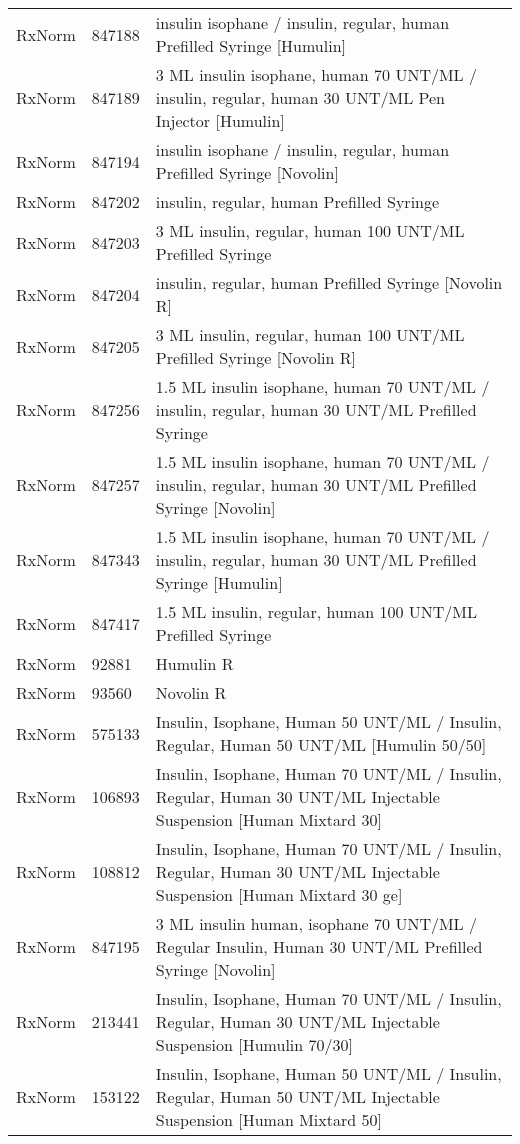 \begin{longtable}{p{}p{}p{}}
  RxNorm & 847188 & insulin isophane / insulin, regular, human Prefilled Syringe [Humulin] \\ 
  RxNorm & 847189 & 3 ML insulin isophane, human 70 UNT/ML / insulin, regular, human 30 UNT/ML Pen Injector [Humulin] \\ 
  RxNorm & 847194 & insulin isophane / insulin, regular, human Prefilled Syringe [Novolin] \\ 
  RxNorm & 847202 & insulin, regular, human Prefilled Syringe \\ 
  RxNorm & 847203 & 3 ML insulin, regular, human 100 UNT/ML Prefilled Syringe \\ 
  RxNorm & 847204 & insulin, regular, human Prefilled Syringe [Novolin R] \\ 
  RxNorm & 847205 & 3 ML insulin, regular, human 100 UNT/ML Prefilled Syringe [Novolin R] \\ 
  RxNorm & 847256 & 1.5 ML insulin isophane, human 70 UNT/ML / insulin, regular, human 30 UNT/ML Prefilled Syringe \\ 
  RxNorm & 847257 & 1.5 ML insulin isophane, human 70 UNT/ML / insulin, regular, human 30 UNT/ML Prefilled Syringe [Novolin] \\ 
  RxNorm & 847343 & 1.5 ML insulin isophane, human 70 UNT/ML / insulin, regular, human 30 UNT/ML Prefilled Syringe [Humulin] \\ 
  RxNorm & 847417 & 1.5 ML insulin, regular, human 100 UNT/ML Prefilled Syringe \\ 
  RxNorm & 92881 & Humulin R \\ 
  RxNorm & 93560 & Novolin R \\ 
  RxNorm & 575133 & Insulin, Isophane, Human 50 UNT/ML / Insulin, Regular, Human 50 UNT/ML [Humulin 50/50] \\ 
  RxNorm & 106893 & Insulin, Isophane, Human 70 UNT/ML / Insulin, Regular, Human 30 UNT/ML Injectable Suspension [Human Mixtard 30] \\ 
  RxNorm & 108812 & Insulin, Isophane, Human 70 UNT/ML / Insulin, Regular, Human 30 UNT/ML Injectable Suspension [Human Mixtard 30 ge] \\ 
  RxNorm & 847195 & 3 ML insulin human, isophane 70 UNT/ML / Regular Insulin, Human 30 UNT/ML Prefilled Syringe [Novolin] \\ 
  RxNorm & 213441 & Insulin, Isophane, Human 70 UNT/ML / Insulin, Regular, Human 30 UNT/ML Injectable Suspension [Humulin 70/30] \\ 
  RxNorm & 153122 & Insulin, Isophane, Human 50 UNT/ML / Insulin, Regular, Human 50 UNT/ML Injectable Suspension [Human Mixtard 50] \\ 

\end{longtable}
